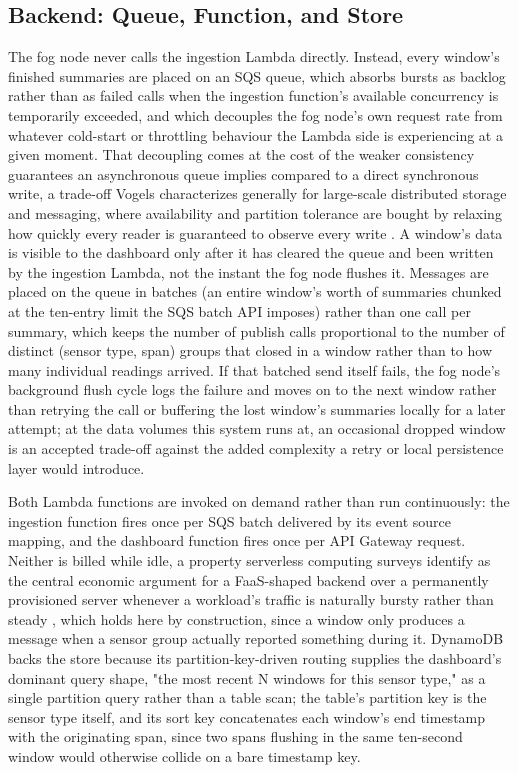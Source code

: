 \documentclass[conference]{IEEEtran}
\begin{document}
\subsection{Backend: Queue, Function, and Store}

The fog node never calls the ingestion Lambda directly. Instead, every window's finished summaries are placed on an SQS queue, which absorbs bursts as backlog rather than as failed calls when the ingestion function's available concurrency is temporarily exceeded, and which decouples the fog node's own request rate from whatever cold-start or throttling behaviour the Lambda side is experiencing at a given moment. That decoupling comes at the cost of the weaker consistency guarantees an asynchronous queue implies compared to a direct synchronous write, a trade-off Vogels characterizes generally for large-scale distributed storage and messaging, where availability and partition tolerance are bought by relaxing how quickly every reader is guaranteed to observe every write \cite{ref7}. A window's data is visible to the dashboard only after it has cleared the queue and been written by the ingestion Lambda, not the instant the fog node flushes it. Messages are placed on the queue in batches (an entire window's worth of summaries chunked at the ten-entry limit the SQS batch API imposes) rather than one call per summary, which keeps the number of publish calls proportional to the number of distinct (sensor type, span) groups that closed in a window rather than to how many individual readings arrived. If that batched send itself fails, the fog node's background flush cycle logs the failure and moves on to the next window rather than retrying the call or buffering the lost window's summaries locally for a later attempt; at the data volumes this system runs at, an occasional dropped window is an accepted trade-off against the added complexity a retry or local persistence layer would introduce.

Both Lambda functions are invoked on demand rather than run continuously: the ingestion function fires once per SQS batch delivered by its event source mapping, and the dashboard function fires once per API Gateway request. Neither is billed while idle, a property serverless computing surveys identify as the central economic argument for a FaaS-shaped backend over a permanently provisioned server whenever a workload's traffic is naturally bursty rather than steady \cite{ref8}, which holds here by construction, since a window only produces a message when a sensor group actually reported something during it. DynamoDB backs the store because its partition-key-driven routing supplies the dashboard's dominant query shape, "the most recent N windows for this sensor type," as a single partition query rather than a table scan; the table's partition key is the sensor type itself, and its sort key concatenates each window's end timestamp with the originating span, since two spans flushing in the same ten-second window would otherwise collide on a bare timestamp key.
\end{document}
